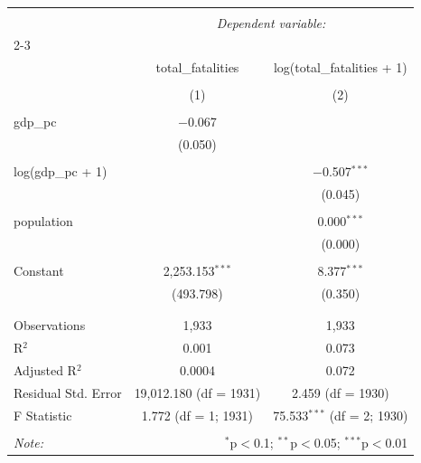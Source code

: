 
\begin{table}[!htbp] \centering 
  \caption{} 
  \label{} 
\begin{tabular}{@{\extracolsep{5pt}}lcc} 
\\[-1.8ex]\hline 
\hline \\[-1.8ex] 
 & \multicolumn{2}{c}{\textit{Dependent variable:}} \\ 
\cline{2-3} 
\\[-1.8ex] & total\_fatalities & log(total\_fatalities + 1) \\ 
\\[-1.8ex] & (1) & (2)\\ 
\hline \\[-1.8ex] 
 gdp\_pc & $-$0.067 &  \\ 
  & (0.050) &  \\ 
  & & \\ 
 log(gdp\_pc + 1) &  & $-$0.507$^{***}$ \\ 
  &  & (0.045) \\ 
  & & \\ 
 population &  & 0.000$^{***}$ \\ 
  &  & (0.000) \\ 
  & & \\ 
 Constant & 2,253.153$^{***}$ & 8.377$^{***}$ \\ 
  & (493.798) & (0.350) \\ 
  & & \\ 
\hline \\[-1.8ex] 
Observations & 1,933 & 1,933 \\ 
R$^{2}$ & 0.001 & 0.073 \\ 
Adjusted R$^{2}$ & 0.0004 & 0.072 \\ 
Residual Std. Error & 19,012.180 (df = 1931) & 2.459 (df = 1930) \\ 
F Statistic & 1.772 (df = 1; 1931) & 75.533$^{***}$ (df = 2; 1930) \\ 
\hline 
\hline \\[-1.8ex] 
\textit{Note:}  & \multicolumn{2}{r}{$^{*}$p$<$0.1; $^{**}$p$<$0.05; $^{***}$p$<$0.01} \\ 
\end{tabular} 
\end{table} 
